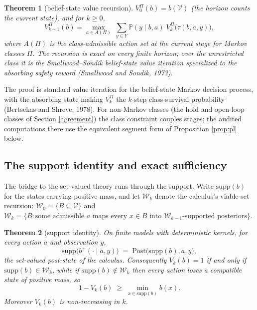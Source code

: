 \documentclass[10pt,twocolumn]{article}
\theoremstyle{plain}
\newtheorem{theorem}{Theorem}
\theoremstyle{definition}
\theoremstyle{remark}
\begin{document}
\begin{theorem}[belief-state value recursion]\label{thm:recursion}
\(V^{\Pi}_{0}(b) = b(\mathcal{V})\) (the horizon counts the current
state), and for \(k \ge 0\),
\[
V^{\Pi}_{k+1}(b) = \max_{a \in A(\Pi)}\; \sum_{y \in Y} \mathbb{P}(y \mid
b, a)\; V^{\Pi}_{k}\bigl(\tau(b, a, y)\bigr),
\]
where \(A(\Pi)\) is the class-admissible action set at the current stage
for Markov classes \(\Pi\). The recursion is exact on every finite
horizon; over the unrestricted class it is the Smallwood--Sondik
belief-state value iteration specialized to the absorbing safety reward
(Smallwood and Sondik, 1973).
\end{theorem}

The proof is standard value iteration for the belief-state Markov decision
process, with the absorbing state making \(V^{\Pi}_{k}\) the \(k\)-step
class-survival probability (Bertsekas and Shreve, 1978). For non-Markov
classes (the hold and open-loop classes of Section \ref{agreement}) the
class constraint couples stages; the audited computations there use the
equivalent segment form of Proposition \ref{prop:pl} below.

\subsection{The support identity and exact sufficiency}\label{support}

The bridge to the set-valued theory runs through the support. Write
\(\mathrm{supp}(b)\) for the states carrying positive mass, and let
\(\mathcal{W}_{k}\) denote the calculus's viable-set recursion:
\(\mathcal{W}_{0} = \{B \subseteq \mathcal{V}\}\) and
\(\mathcal{W}_{k} = \{B : \text{some admissible } a \text{ maps every }
x \in B \text{ into } \mathcal{W}_{k-1}\text{-supported posteriors}\}\).

\begin{theorem}[support identity]\label{thm:support}
On finite models with deterministic kernels, for every action \(a\) and
observation \(y\),
\[
\mathrm{supp}\bigl(b^{+}(\cdot \mid a, y)\bigr)
\;=\; \mathrm{Post}\bigl(\mathrm{supp}(b), a, y\bigr),
\]
the set-valued post-state of the calculus. Consequently
\(V_{k}(b) = 1\) if and only if
\(\mathrm{supp}(b) \in \mathcal{W}_{k}\), while if
\(\mathrm{supp}(b) \notin \mathcal{W}_{k}\) then every action loses a
compatible state of positive mass, so
\[
1 - V_{k}(b) \;\ge\; \min_{x \in \mathrm{supp}(b)} b(x).
\]
Moreover \(V_{k}(b)\) is non-increasing in \(k\).
\end{theorem}
\end{document}
